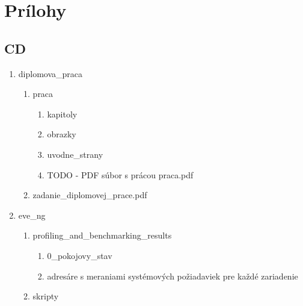 \chapter{Prílohy}
\label{chap:prilohy}





\section{CD}
\label{chap:cd}


\begin{enumerate}[noitemsep,label*=\thesection.\arabic*.]
    \item diplomova\_praca
    
    \begin{enumerate}[noitemsep,label*=\arabic*.]
        \item praca
        
        \begin{enumerate}[noitemsep,label*=\arabic*.]
            \item kapitoly
            \item obrazky
            \item uvodne\_strany
            \item {\huge TODO - PDF súbor s prácou} praca.pdf
        \end{enumerate}
        
        \item zadanie\_diplomovej\_prace.pdf
    \end{enumerate}
    
    \item \label{item:prilohy_cd_eve_ng_adresar} eve\_ng
    
    \begin{enumerate}[noitemsep,label*=\arabic*.]
        \item profiling\_and\_benchmarking\_results
        
        \begin{enumerate}[noitemsep,label*=\arabic*.]
            \item 0\_pokojovy\_stav
            \item \label{item:all_benchmarks} adresáre s meraniami systémových požiadaviek pre každé zariadenie
        \end{enumerate}
        
        \item \label{item:skripty} skripty
        

\end{enumerate}
\end{enumerate}
